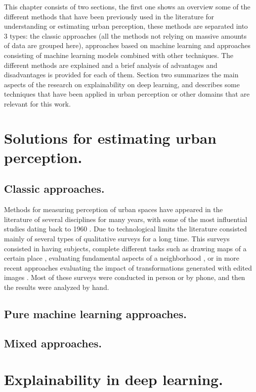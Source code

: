 This chapter consists of two sections, the first one shows an overview some of the
different methods that have been previously used in the literature
for understanding or estimating urban perception, these methods are separated
into 3 types: the classic approaches (all the methods not relying on
massive amounts of data are grouped here), approaches based on machine learning and
approaches consisting of machine learning models combined with other techniques.
The different methods are explained and a brief analysis of advantages and disadvantages
is provided for each of them. Section two summarizes the main aspects of the research
on explainability on deep learning, and describes some techniques that have been applied
in urban perception or other domains that are relevant for this work.


\section{Solutions for estimating urban perception.}

\subsection{Classic approaches.}
Methods for measuring perception of urban spaces have appeared in the literature of several
disciplines for many years,  with some of the most influential studies dating back to 1960
\cite{lynch}. Due to technological limits the literature consisted mainly of several types of
qualitative surveys for a long time. This surveys consisted in having subjects, complete
different tasks such as drawing maps of a certain place \cite{lynch}, evaluating fundamental
aspects of a neighborhood \cite{nasar_perception}, or in more recent approaches evaluating
the impact of transformations generated with edited images \cite{jiang_minimizing}. Most of
these surveys were conducted in person or by phone, and then the results were analyzed by hand.







\subsection{Pure machine learning approaches.}

\subsection{Mixed approaches.}

\section{ Explainability in deep learning.}